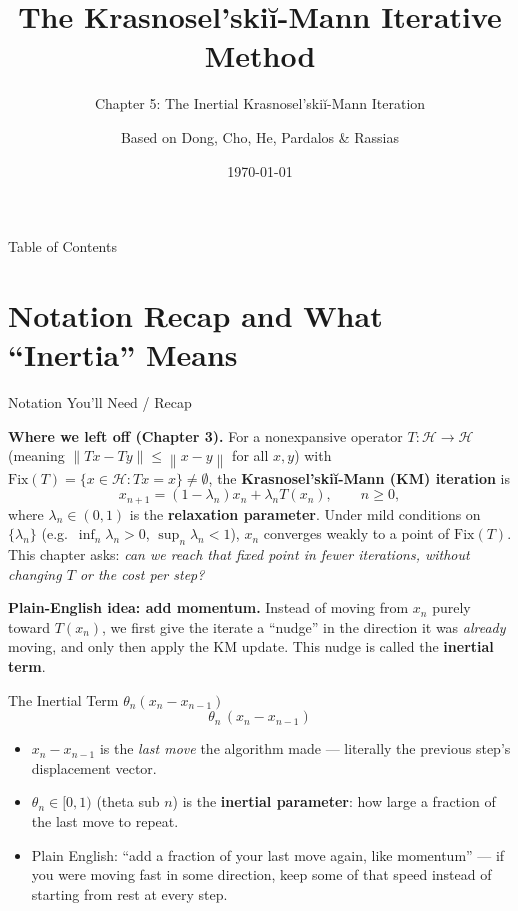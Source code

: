 \documentclass[aspectratio=169,10pt]{beamer}
\title[KM Method -- Ch.5]{The Krasnosel'ski\u{i}-Mann Iterative Method}
\subtitle{Chapter 5: The Inertial Krasnosel'ski\u{i}-Mann Iteration}
\author{Based on Dong, Cho, He, Pardalos \& Rassias}
\date{\today}
\newcommand{\mHH}{\mathcal H}
\newcommand{\norm}[1]{\left\|#1\right\|}
\newcommand{\Fix}{\mathrm{Fix}}
\begin{document}
\begin{frame}
  \titlepage
\end{frame}

\begin{frame}{Table of Contents}
  \tableofcontents
\end{frame}

\section{Notation Recap and What ``Inertia'' Means}

\begin{frame}[allowframebreaks]{Notation You'll Need / Recap}

  \textbf{Where we left off (Chapter 3).}  For a nonexpansive
  operator $T:\mHH\to\mHH$ (meaning $\norm{Tx-Ty}\le\norm{x-y}$
  for all $x,y$) with $\Fix(T)=\{x\in\mHH : Tx=x\}\neq\emptyset$,
  the \textbf{Krasnosel'ski\u{i}-Mann (KM) iteration} is
  \[
    x_{n+1} = (1-\lambda_n)x_n + \lambda_n T(x_n), \qquad n\ge 0,
  \]
  where $\lambda_n\in(0,1)$ is the \textbf{relaxation parameter}.
  Under mild conditions on $\{\lambda_n\}$ (e.g.\ $\inf_n\lambda_n>0$,
  $\sup_n\lambda_n<1$), $x_n$ converges weakly to a point of
  $\Fix(T)$.  This chapter asks: \emph{can we reach that fixed
  point in fewer iterations, without changing $T$ or the cost per
  step?}

  \vspace{0.5em}
  \textbf{Plain-English idea: add momentum.}  Instead of moving
  from $x_n$ purely toward $T(x_n)$, we first give the iterate a
  ``nudge'' in the direction it was \emph{already} moving, and only
  then apply the KM update.  This nudge is called the
  \textbf{inertial term}.

  \begin{block}{The Inertial Term $\theta_n(x_n - x_{n-1})$}
    \[
      \theta_n\,(x_n - x_{n-1})
    \]
    \begin{itemize}
      \item $x_n - x_{n-1}$ is the \emph{last move} the algorithm
            made --- literally the previous step's displacement
            vector.
      \item $\theta_n\in[0,1)$ (theta sub $n$) is the
            \textbf{inertial parameter}: how large a fraction of
            the last move to repeat.
      \item Plain English: ``add a fraction of your last move
            again, like momentum'' --- if you were moving fast in
            some direction, keep some of that speed instead of
            starting from rest at every step.
    \end{itemize}
  \end{block}


\end{frame}
\end{document}
